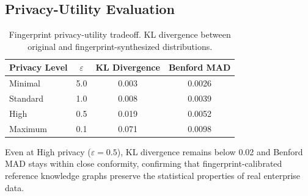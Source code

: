 \subsection{Privacy-Utility Evaluation}
\label{sec:exp_privacy}

\begin{table}[t]
\centering
\caption{Fingerprint privacy-utility tradeoff.  KL divergence between
  original and fingerprint-synthesized distributions.}
\label{tab:privacy_utility}
\small
\begin{tabular}{lccc}
\toprule
\textbf{Privacy Level} & $\varepsilon$ & \textbf{KL Divergence}
  & \textbf{Benford MAD} \\
\midrule
Minimal  & 5.0 & 0.003 & 0.0026 \\
Standard & 1.0 & 0.008 & 0.0039 \\
High     & 0.5 & 0.019 & 0.0052 \\
Maximum  & 0.1 & 0.071 & 0.0098 \\
\bottomrule
\end{tabular}
\end{table}

Even at High privacy ($\varepsilon = 0.5$), KL divergence remains
below 0.02 and Benford MAD stays within close conformity, confirming
that fingerprint-calibrated reference knowledge graphs preserve the
statistical properties of real enterprise data.
